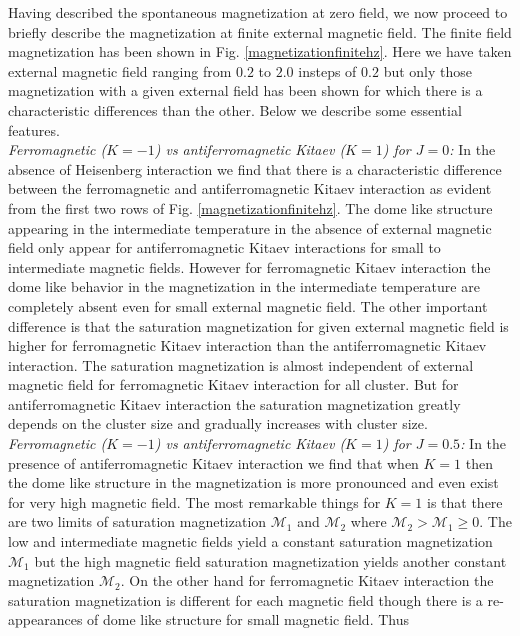\documentclass[aps,amsmath,twocolumn,amssymb,floatfix,showpacs,superscriptaddress,nofootinbib,longbibliography]{revtex4-1}
\begin{document}
Having described the spontaneous magnetization at zero field, we now proceed to briefly describe the magnetization at finite external magnetic field. The finite field magnetization has been shown in Fig. \ref{magnetizationfinitehz}. Here we have taken external magnetic field ranging from $0.2$ to $2.0$ insteps of
$0.2$ but only those magnetization with a given external field has been shown for which there is a characteristic differences than the other. Below we describe some essential features. \\
\indent
{\it \small{Ferromagnetic ($K=-1$) vs antiferromagnetic Kitaev ($K=1$) for $J=0$:}} In the absence of Heisenberg interaction we find that there is a characteristic difference between the ferromagnetic and antiferromagnetic Kitaev interaction as evident from the first two rows of Fig. \ref{magnetizationfinitehz}. The dome like structure
appearing in the intermediate temperature in the absence of external magnetic field only appear for antiferromagnetic Kitaev interactions for small to intermediate magnetic fields. However for ferromagnetic Kitaev interaction the dome like behavior in the magnetization in the intermediate temperature are completely absent
even for small  external magnetic field. The other important difference is that the saturation magnetization for  given external magnetic field is higher for ferromagnetic Kitaev interaction than the antiferromagnetic Kitaev interaction. The saturation magnetization is almost independent of external magnetic field for ferromagnetic Kitaev interaction for all cluster. But for antiferromagnetic Kitaev interaction the saturation magnetization greatly depends on the cluster size and gradually increases with cluster size. \\
\indent
{\it \small{Ferromagnetic ($K=-1$) vs antiferromagnetic Kitaev ($K=1$) for $J=0.5$:}} In the presence of antiferromagnetic Kitaev interaction we find that when $K=1$ then the dome like structure in the magnetization is more pronounced and even exist for very high magnetic field. The most remarkable things for $K=1$
is that there are two limits of saturation magnetization $\mathcal{M}_1$ and $\mathcal{M}_2$ where $\mathcal{M}_2 > \mathcal{M}_1 \ge 0$. The low and intermediate magnetic fields yield a constant saturation magnetization $\mathcal{M}_1$ but the high magnetic field saturation magnetization yields another constant magnetization $\mathcal{M}_2$. On the other hand for ferromagnetic Kitaev interaction the saturation magnetization is different for each magnetic field though there is a re-appearances of dome like structure for small magnetic field. Thus
\end{document}
